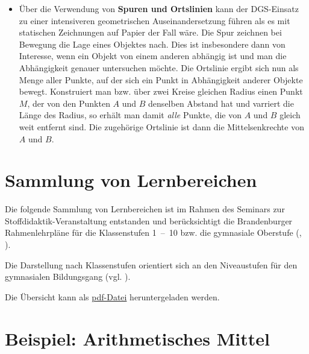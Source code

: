 \documentclass[
]{scrbook}
\providecommand{\tightlist}{%
  \setlength{\itemsep}{0pt}\setlength{\parskip}{0pt}}
\theoremstyle{definition}
\theoremstyle{definition}
\theoremstyle{definition}
\theoremstyle{definition}
\theoremstyle{remark}
\begin{document}
\begin{itemize}
\tightlist
\item
  Über die Verwendung von \textbf{Spuren und Ortslinien} kann der DGS-Einsatz zu einer intensiveren geometrischen Auseinandersetzung führen als es mit statischen Zeichnungen auf Papier der Fall wäre. Die Spur zeichnen bei Bewegung die Lage eines Objektes nach. Dies ist insbesondere dann von Interesse, wenn ein Objekt von einem anderen abhängig ist und man die Abhängigkeit genauer untersuchen möchte. Die Ortslinie ergibt sich nun als Menge aller Punkte, auf der sich ein Punkt in Abhängigkeit anderer Objekte bewegt. Konstruiert man bzw. über zwei Kreise gleichen Radius einen Punkt \(M\), der von den Punkten \(A\) und \(B\) denselben Abstand hat und varriert die Länge des Radius, so erhält man damit \emph{alle} Punkte, die von \(A\) und \(B\) gleich weit entfernt sind. Die zugehörige Ortslinie ist dann die Mittelsenkrechte von \(A\) und \(B\).
\end{itemize}

\appendix


\chapter{Sammlung von Lernbereichen}\label{sammlung-von-lernbereichen}

Die folgende Sammlung von Lernbereichen ist im Rahmen des Seminars zur Stoffdidaktik-Veranstaltung entstanden und berücksichtigt die Brandenburger Rahmenlehrpläne für die Klassenstufen 1~--~10 bzw. die gymnasiale Oberstufe (, ).

Die Darstellung nach Klassenstufen orientiert sich an den Niveaustufen für den gymnasialen Bildungsgang (vgl. ).

Die Übersicht kann als \href{files/Stoffdidaktik2024-SammlungLernbereiche.pdf}{pdf-Datei} heruntergeladen werden.

\chapter{Beispiel: Arithmetisches Mittel}\label{beispiel-arithmetisches-mittel}
\end{document}
